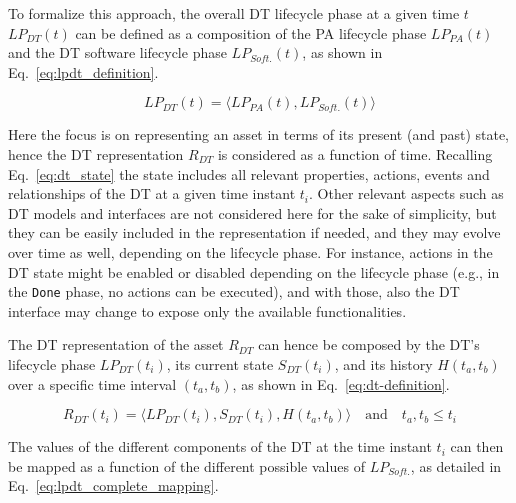 To formalize this approach, the overall \ac{DT} lifecycle phase at a given time $t$ $LP_{DT}(t)$ can be defined as a composition of the \ac{PA} lifecycle phase $LP_{PA}(t)$ and the \ac{DT} software lifecycle phase $LP_{Soft.}(t)$, as shown in Eq.~\ref{eq:lpdt_definition}.

\begin{equation}
LP_{DT}(t) = \langle  LP_{PA}(t), LP_{Soft.}(t)\rangle
\label{eq:lpdt_definition}
\end{equation}

Here the focus is on representing an asset in terms of its present (and past) state, hence the \ac{DT} representation $R_{DT}$ is considered as a function of time.
%
Recalling Eq.~\ref{eq:dt_state} the state includes all relevant properties, actions, events and relationships of the \ac{DT} at a given time instant $t_i$.
%
Other relevant aspects such as \ac{DT} models and interfaces are not considered here for the sake of simplicity, but they can be easily included in the representation if needed, and they may evolve over time as well, depending on the lifecycle phase.
%
For instance, actions in the \ac{DT} state might be enabled or disabled depending on the lifecycle phase (e.g., in the \texttt{Done} phase, no actions can be executed), and with those, also the \ac{DT} interface may change to expose only the available functionalities.

The \ac{DT} representation of the asset $R_{DT}$ can hence be composed by the \ac{DT}'s lifecycle phase $LP_{DT}(t_i)$, its current state $S_{DT}(t_i)$, and its history $H(t_a, t_b)$ over a specific time interval $(t_a, t_b)$, as shown in Eq.~\ref{eq:dt-definition}.

\begin{equation}
R_{DT}(t_i) = \langle LP_{DT}(t_i), S_{DT}(t_i), H(t_a, t_b)\rangle \quad \text{and} \quad  t_a, t_b \leq t_i
\label{eq:dt-definition}
\end{equation}

The values of the different components of the \ac{DT} at the time instant $t_i$ can then be mapped as a function of the different possible values of $LP_{Soft.}$, as detailed in Eq.~\ref{eq:lpdt_complete_mapping}.

